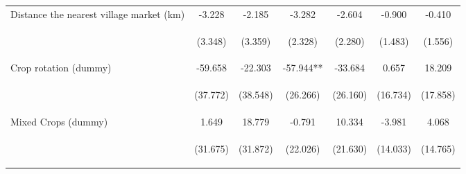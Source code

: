 \begin{center}
\begin{tabular}{lcccccc}
Distance the nearest village market (km) & -3.228 & -2.185 & -3.282 & -2.604 & -0.900 & -0.410 \\
\vspace{4pt} & \begin{footnotesize}(3.348)\end{footnotesize} & \begin{footnotesize}(3.359)\end{footnotesize} & \begin{footnotesize}(2.328)\end{footnotesize} & \begin{footnotesize}(2.280)\end{footnotesize} & \begin{footnotesize}(1.483)\end{footnotesize} & \begin{footnotesize}(1.556)\end{footnotesize} \\
Crop rotation (dummy) & -59.658 & -22.303 & -57.944** & -33.684 & 0.657 & 18.209 \\
\vspace{4pt} & \begin{footnotesize}(37.772)\end{footnotesize} & \begin{footnotesize}(38.548)\end{footnotesize} & \begin{footnotesize}(26.266)\end{footnotesize} & \begin{footnotesize}(26.160)\end{footnotesize} & \begin{footnotesize}(16.734)\end{footnotesize} & \begin{footnotesize}(17.858)\end{footnotesize} \\
Mixed Crops (dummy) & 1.649 & 18.779 & -0.791 & 10.334 & -3.981 & 4.068 \\
\vspace{4pt} & \begin{footnotesize}(31.675)\end{footnotesize} & \begin{footnotesize}(31.872)\end{footnotesize} & \begin{footnotesize}(22.026)\end{footnotesize} & \begin{footnotesize}(21.630)\end{footnotesize} & \begin{footnotesize}(14.033)\end{footnotesize} & \begin{footnotesize}(14.765)\end{footnotesize} \\

\end{tabular}
\end{center}
